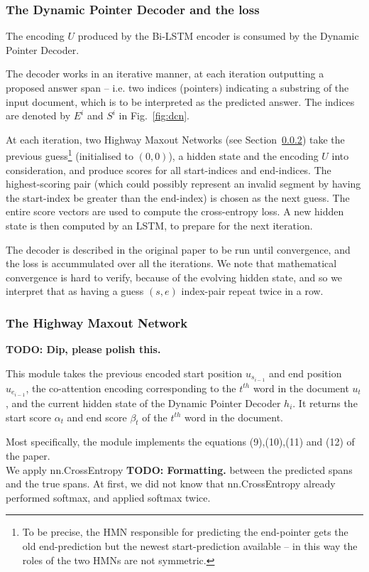 \documentclass[a4paper, 10pt, conference]{article}
\newcommand{\TODOx}[1]{{\color{red}\textbf{TODO: #1}}}
\begin{document}
\subsubsection{The Dynamic Pointer Decoder and the loss}

The encoding $U$ produced by the Bi-LSTM encoder is consumed by the Dynamic Pointer Decoder.

The decoder works in an iterative manner, at each iteration outputting a proposed answer span -- i.e. two indices (pointers) indicating a substring of the input document, which is to be interpreted as the predicted answer. The indices are denoted by $E^i$ and $S^i$ in Fig.~\ref{fig:dcn}.

At each iteration, two Highway Maxout Networks (see Section~\ref{sssec:hmn}) take the previous guess\footnote{To be precise, the HMN responsible for predicting the end-pointer gets the old end-prediction but the newest start-prediction available -- in this way the roles of the two HMNs are not symmetric.} (initialised to $(0,0)$), a hidden state and the encoding $U$ into consideration, and produce scores for all start-indices and end-indices. The highest-scoring pair (which could possibly represent an invalid segment by having the start-index be greater than the end-index) is chosen as the next guess. The entire score vectors are used to compute the cross-entropy loss. A new hidden state is then computed by an LSTM, to prepare for the next iteration.

The decoder is described in the original paper to be run until convergence, and the loss is accummulated over all the iterations. 
We note that mathematical convergence is hard to verify, because of the evolving hidden state, and so we interpret that as having a guess $(s,e)$ index-pair repeat twice in a row.


\subsubsection{The Highway Maxout Network}\label{sssec:hmn} \TODOx{Dip, please polish this.}

This module takes the previous encoded start position $u_{s_{i-1}}$ and end position $u_{e_{i-1}}$, the co-attention encoding corresponding to the $t^{th}$ word in the document $u_{t}$, and the current hidden state of the Dynamic Pointer Decoder $h_i$. It returns the start score $\alpha_t$ and end score $\beta_t$ of the $t^{th}$ word in the document.

Most specifically, the module implements the equations (9),(10),(11) and (12) of the paper. \\
We apply nn.CrossEntropy \TODOx{Formatting.} between the predicted spans and the true spans. At first, we did not know that nn.CrossEntropy already performed softmax, and applied softmax twice. 
\end{document}

